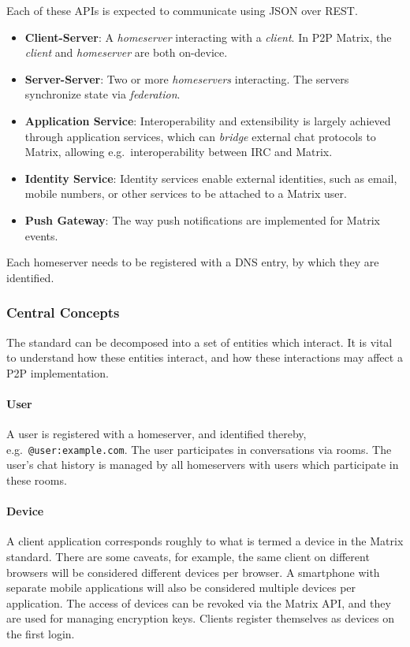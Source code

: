 Each of these \ac{API}s is expected to communicate using \ac{JSON} over \ac{REST}.
\begin{itemize}
	\item \textbf{Client-Server}:
	      A \textit{homeserver} interacting with a \textit{client}.
	      In \ac{P2P} Matrix, the \textit{client} and \textit{homeserver} are both on-device.
	\item \textbf{Server-Server}:
	      Two or more \textit{homeservers} interacting.
	      The servers synchronize state via \textit{federation}.
	\item \textbf{Application Service}:
	      Interoperability and extensibility is largely achieved through application services, which can \textit{bridge} external chat protocols to Matrix, allowing e.g.~interoperability between \ac{IRC} and Matrix.
	\item \textbf{Identity Service}:
	      Identity services enable external identities, such as email, mobile numbers, or other services to be attached to a Matrix user.
	\item \textbf{Push Gateway}:
	      The way push notifications are implemented for Matrix events.
\end{itemize}

Each homeserver needs to be registered with a \ac{DNS} entry, by which they are identified.

\subsubsection{Central Concepts}
The standard can be decomposed into a set of entities which interact.
It is vital to understand how these entities interact, and how these interactions may affect a \ac{P2P} implementation.

\paragraph{User}
A user is registered with a homeserver, and identified thereby, e.g.~\texttt{@user:example.com}.
The user participates in conversations via rooms.
The user's chat history is managed by all homeservers with users which participate in these rooms.

\paragraph{Device}
A client application corresponds roughly to what is termed a device in the Matrix standard.
There are some caveats, for example, the same client on different browsers will be considered different devices per browser.
A smartphone with separate mobile applications will also be considered multiple devices per application.
The access of devices can be revoked via the Matrix \ac{API}, and they are used for managing encryption keys.
Clients register themselves as devices on the first login.

